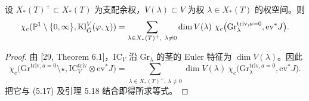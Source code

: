 \begin{corollary}
设 $X_*(T)^+\subset X_*(T)$ 为支配余权，$V(\lambda)\subset V$ 为权 $\lambda\in X_*(T)$ 的权空间。则
\[
\chi_c(\PP^1\setminus\{0,\infty\},\Kl^V_{\ckG}(\varphi,\chi))=\sum_{\lambda\in X_*(T)^+,\ \lambda\neq 0}\dim V(\lambda)\ \chi_c\big(\mathrm{Gr}^{\mathrm{triv},a=0}_\lambda,\mathrm{ev}^*J\big).
\]
\end{corollary}

\begin{proof}
由 [29, Theorem 6.1]，$\mathrm{IC}_V$ 沿 $\mathrm{Gr}_\lambda$ 的茎的 Euler 特征为 $\dim V(\lambda)$。因此
\[
\chi_c\big(\mathrm{Gr}^{\mathrm{triv},a=0}\setminus\star,\mathrm{IC}^{\mathrm{triv}}_V\otimes\mathrm{ev}^*J\big)=\sum_{\lambda\in X_*(T)^+,\ \lambda\neq 0}\dim V(\lambda)\ \chi_c\big(\mathrm{Gr}^{\mathrm{triv},a=0}_\lambda,\mathrm{ev}^*J\big).
\]
把它与 (5.17) 及引理 5.18 结合即得所求等式。
\end{proof}
